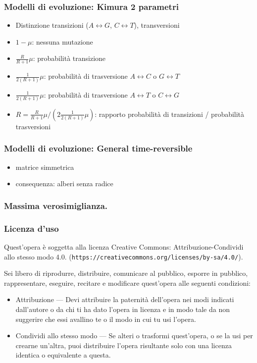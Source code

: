 \begin{frame}[fragile]
	\frametitle{Modelli di evoluzione: Kimura 2 parametri}
	\begin{itemize}
		\item
		      Distinzione transizioni ($A\leftrightarrow G$, $C\leftrightarrow T$), transversioni
		\item
		      $1-\mu$: nessuna mutazione
		\item
		      $\frac{R}{R+1}\mu$: probabilità transizione
		\item
		      $\frac{1}{2(R+1)}\mu$: probabilità di trasversione $A\leftrightarrow C$ o $G\leftrightarrow T$
		\item
		      $\frac{1}{2(R+1)}\mu$: probabilità di trasversione $A\leftrightarrow T$ o $C\leftrightarrow G$
		\item
		      $R = \frac{R}{R+1}\mu / \left(2 \frac{1}{2(R+1)}\mu \right)$: rapporto probabilità di transizioni / probabilità trasversioni
	\end{itemize}
\end{frame}

\begin{frame}[fragile]
	\frametitle{Modelli di evoluzione: General time-reversible}
	\begin{itemize}
		\item
		      matrice simmetrica
		\item
		      consequenza: alberi senza radice
	\end{itemize}
\end{frame}


\begin{frame}[fragile]
	\frametitle{Massima verosimiglianza.}
\end{frame}



\begin{frame}[containsverbatim]\frametitle{Licenza d'uso}
	\small

	Quest'opera {\`e} soggetta alla licenza Creative Commons:
	Attribuzione-Condividi allo stesso modo 4.0.
	(\verb+https://creativecommons.org/licenses/by-sa/4.0/+).

	Sei libero di riprodurre, distribuire, comunicare al pubblico, esporre
	in pubblico, rappresentare, eseguire, recitare e modificare quest'opera
	alle seguenti condizioni:
	\begin{itemize}
		\item
		      Attribuzione — Devi attribuire la paternit{\`a} dell'opera nei modi
		      indicati dall'autore o da chi ti ha dato l'opera in licenza e in modo tale da
		      non suggerire che essi avallino te o il modo in cui tu usi l'opera.
		\item
		      Condividi allo stesso modo — Se alteri o trasformi quest'opera, o se
		      la usi per crearne un'altra, puoi distribuire l'opera risultante solo con
		      una licenza identica o equivalente a  questa.
	\end{itemize}
\end{frame}


